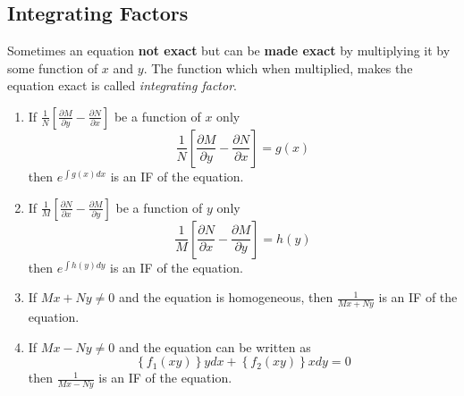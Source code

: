 \documentclass[oneside]{book}
\begin{document}
\subsection{Integrating Factors}
Sometimes an equation \textbf{not exact} but can be \textbf{made exact} by multiplying it by some function of $x$ and $y$. The function which when multiplied, makes the equation exact is called \textit{integrating factor}.
\renewcommand{\labelenumi}{\textbf{\arabic{enumi}:}}
\begin{enumerate}
	\item If
	      \(
	      \displaystyle\frac{1}{N}\left[\frac{\partial M}{\partial y} - \frac{\partial N}{\partial x}\right]
	      \)
	      be a function of $x$ only
	      \[
		      \frac{1}{N}\left[\frac{\partial M}{\partial y} - \frac{\partial N}{\partial x}\right] = g(x)
	      \]
	      then \(\displaystyle e^{\int g(x) dx}\) is an IF of the equation.
	\item If
	      \(
	      \displaystyle\frac{1}{M}\left[\frac{\partial N}{\partial x} - \frac{\partial M}{\partial y}\right]
	      \)
	      be a function of $y$ only
	      \[
		      \frac{1}{M}\left[\frac{\partial N}{\partial x} - \frac{\partial M}{\partial y}\right] = h(y)
	      \]
	      then \(\displaystyle e^{\int h(y) dy}\) is an IF of the equation.
	\item If
	      \(
	      \displaystyle Mx + Ny \neq 0
	      \)
	      and the equation is homogeneous,
	      then \(\displaystyle \frac{1}{Mx + Ny}\) is an IF of the equation.
	\item If
	      \(
	      \displaystyle Mx - Ny \neq 0
	      \)
	      and the equation can be written as
	      \[
		      \left\{f_1(xy)\right\}ydx + \left\{f_2(xy)\right\}xdy = 0
	      \]
	      then \(\displaystyle \frac{1}{Mx - Ny}\) is an IF of the equation.
\end{enumerate}


\end{document}
